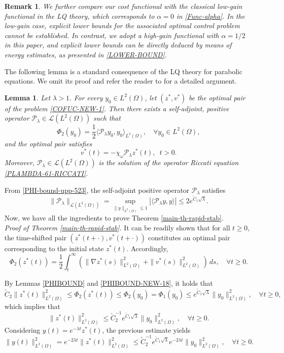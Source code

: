 \documentclass[a4paper]{article}
\newtheorem{lemma}[theorem]{Lemma}
\newtheorem{remark}[theorem]{Remark}
\numberwithin{equation}{section}
\begin{document}
\begin{remark}\label{cost-func-remark}
We further compare our cost functional with the classical low-gain functional in the LQ theory, which corresponds to $\alpha=0$ in \eqref{Func-alpha}. In the low-gain case, explicit lower bounds for the associated optimal control problem cannot be established. In contrast, we adopt a high-gain functional with $\alpha=1/2$ in this paper, and explicit lower bounds can be directly deduced by means of energy estimates, as presented in \eqref{LOWER-BOUND}.
\end{remark}

The following lemma is a standard consequence of the LQ theory for parabolic equations. We omit its proof and refer the reader to \cite{B2} for a detailed argument.

\begin{lemma}\label{lemma3.1}
Let $\lambda> 1$. For every $y_0\in L^2(\Omega)$, let $ (z^*,v^*)$ be the optimal pair of the problem \eqref{COFUC-NEW-1}. Then there exists a self-adjoint, positive operator $\mathcal P_\lambda\in \mathcal L(L^2(\Omega))$ such that
\begin{equation}\label{PHI-P-NEW-12}
\Phi_2(y_0)=\frac12\langle \mathcal P_\lambda y_0,y_0\rangle_{L^2(\Omega)},\quad \forall y_0\in L^2(\Omega),
\end{equation}
and the optimal pair satisfies
$$v^*(t)=-\chi_\omega \mathcal P_\lambda z^*(t),\;\; t>0.$$
Moreover, $\mathcal P_\lambda\in\mathcal{L}(L^2(\Omega))$ is the solution of the operator Riccati equation \eqref{PLAMBDA-61-RICCATI}.
\end{lemma}

From \eqref{PHI-bound-upp-523}, the self-adjoint positive operator $\mathcal{P}_{\lambda}$ satisfies
$$\|\mathcal{P}_\lambda\|_{\mathcal L(L^2(\Omega))}=\sup_{\|y\|_{L^2(\Omega)}\le 1}|\langle \mathcal{P}_\lambda y,y\rangle|\le 2e^{\tilde{C}_1\sqrt{\lambda}}.$$ 
Now, we have all the ingredients to prove Theorem \ref{main-th-rapid-stab}.\\[-2mm] 

\noindent\textit{Proof of Theorem \ref{main-th-rapid-stab}.} It can be readily shown that for all $t\ge0$, the time-shifted pair $(z^*(t+\cdot),v^*(t+\cdot))$ constitutes an optimal pair corresponding to the initial state $z^*(t)$. Accordingly,
$$\Phi_2(z^*(t))=\frac12\int_t^\infty\left(\|\nabla z^*(s)\|_{L^2(\Omega)}^2+\|v^*(s)\|_{L^2(\Omega)}^2\right)\,ds,\quad \forall t\ge0.$$

By Lemmas \ref{PHIBOUND} and \ref{PHIBOUND-NEW-18}, it holds that
$$\tilde C_2\|z^*(t)\|_{L^2(\Omega)}^2\le\Phi_2(z^*(t))\le \Phi_2(y_0) {= \Phi_1(y_0)} \le e^{\tilde{C}_1\sqrt{\lambda}}\|y_0\|_{L^2(\Omega)}^2,\quad \forall t\ge0,$$
which implies that
$$\|z^*(t)\|_{L^2(\Omega)}^2\le\tilde C_2^{-1}  e^{\tilde C_1\sqrt{\lambda}}\|y_0\|_{L^2(\Omega)}^2,\quad \forall t\ge0.$$
Considering $y(t)=e^{-\lambda t}z^*(t)$, the previous estimate yields
\begin{equation}\label{y-cost-esti}
\|y(t)\|_{L^2(\Omega)}^2=e^{-2\lambda t}\|z^*(t)\|_{L^2(\Omega)}^2\le\tilde C_2^{-1} e^{\tilde C_1\sqrt{\lambda}}e^{-2\lambda t}\|y_0\|_{L^2(\Omega)}^2,\quad \forall t\ge0.
\end{equation}
\end{document}
